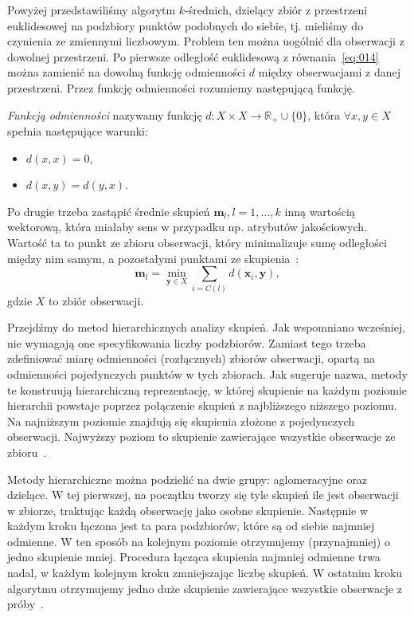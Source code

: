 \documentclass{praca1}
\begin{document}
Powyżej przedstawiliśmy algorytm $k$-średnich, dzielący zbiór z przestrzeni euklidesowej na podzbiory punktów podobnych do siebie, tj. mieliśmy do czynienia ze zmiennymi liczbowym. Problem ten można uogólnić dla obserwacji z dowolnej przestrzeni. Po pierwsze odległość euklidesową z równania~\eqref{eq:014} można zamienić na dowolną funkcję odmienności $d$ między obserwacjami z danej przestrzeni. Przez funkcję odmienności rozumiemy następującą funkcję.

\begin{definition}
\emph{Funkcją odmienności} nazywamy funkcję $d: X\times X \rightarrow \mathbb{R}_+\cup\{0\}$, która $\forall x, y \in X$ spełnia następujące warunki:
\begin{itemize}
\item $d(x,x) = 0$,
\item $d(x,y) = d(y,x)$.
\end{itemize}
\end{definition}

Po drugie trzeba zastąpić średnie skupień $\mathbf{m}_l, l=1,\ldots,k$ inną wartością wektorową, która miałaby sens w przypadku np. atrybutów jakościowych. Wartość ta to punkt ze zbioru obserwacji, który minimalizuje sumę odległości między nim samym, a pozostałymi punktami ze skupienia~\cite{Koronacki2005:statystyczne}:
\begin{equation}
\mathbf{m}_l = \min\limits_{\mathbf{y} \in X} \sum\limits_{i = C(l)} d(\mathbf{x}_i, \mathbf{y}),
\end{equation}
gdzie $X$ to zbiór obserwacji.

Przejdźmy do metod hierarchicznych analizy skupień. Jak wspomniano wcześniej, nie wymagają one specyfikowania liczby podzbiorów. Zamiast tego trzeba zdefiniować miarę odmienności (rozłącznych) zbiorów obserwacji, opartą na odmienności pojedynczych punktów w tych zbiorach. Jak sugeruje nazwa, metody te konstruują hierarchiczną reprezentację, w której skupienie na każdym poziomie hierarchii powstaje poprzez połączenie skupień z najbliższego niższego poziomu. Na najniższym poziomie znajdują się skupienia złożone z pojedynczych obserwacji. Najwyższy poziom to skupienie zawierające wszystkie obserwacje ze zbioru~\cite{Hastie2009:elements}.

Metody hierarchiczne można podzielić na dwie grupy: aglomeracyjne oraz dzielące. W tej pierwszej, na początku tworzy się tyle skupień ile jest obserwacji w zbiorze, traktując każdą obserwację jako osobne skupienie. Następnie w każdym kroku łączona jest ta para podzbiorów, które są od siebie najmniej odmienne. W ten sposób na kolejnym poziomie otrzymujemy (przynajmniej) o jedno skupienie mniej. Procedura łącząca skupienia najmniej odmienne trwa nadal, w każdym kolejnym kroku zmniejszając liczbę skupień. W ostatnim kroku algorytmu otrzymujemy jedno duże skupienie zawierające wszystkie obserwacje z próby~\cite{Hastie2009:elements, Koronacki2005:statystyczne}.
\end{document}

